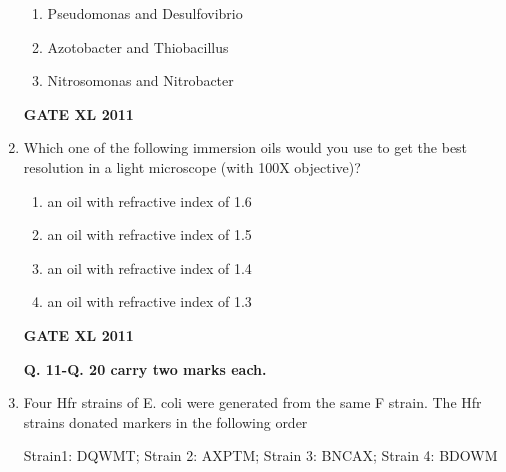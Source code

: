 \documentclass[journal,12pt,onecolumn]{IEEEtran}
\begin{document}
\begin{enumerate}
\begin{enumerate}
			\item Pseudomonas and Desulfovibrio
			\item Azotobacter and Thiobacillus
			\item Nitrosomonas and Nitrobacter
		\end{enumerate}
		\hfill{\textbf{GATE XL 2011}}
\item{ Which one of the following immersion oils would you use to get the best resolution in a light microscope (with 100X objective)?}
		\begin{enumerate}
			\item an oil with refractive index of 1.6
			\item an oil with refractive index of 1.5
			\item an oil with refractive index of 1.4
			\item an oil with refractive index of 1.3
		\end{enumerate}
		\hfill{\textbf{GATE XL 2011}}
\begin{center}
\textbf{Q. 11-Q. 20 carry two marks each.}
\end{center}
\item {Four Hfr strains of E. coli were generated from the same F strain. The Hfr strains donated markers in the following order

Strain1: DQWMT; Strain 2: AXPTM; Strain 3: BNCAX; Strain 4: BDOWM

}
\end{enumerate}
\end{document}
